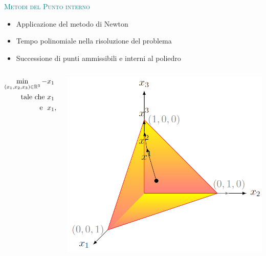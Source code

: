 
\begin{frame}{\textcolor{teal}{\textsc{\LARGE Metodi del Punto interno}}}
	\begin{itemize}
		\pause
		\item Applicazione del metodo di Newton
		\pause
		\item Tempo polinomiale nella risoluzione del problema
		\pause
		\item Successione di punti ammissibili e interni al poliedro
	\end{itemize}
\pause
\begin{columns}
	\begin{column}{0.4\textwidth}
		\begin{align*}
		\min\limits_{(x_{1},x_{2},x_{3})\in\mathbb{R}^{3}} -&x_{1}+ x_{2}-4x_{3}\\
		\text{tale che    }&x_{1}+x_{2}+x_{3}=1,\\
		\text{\; e   \;} &x_{1}, x_{2}, x_{3} \geq 0
		\end{align*}
	\end{column}
	\pause
	\begin{column}{0.4\textwidth}
		\includegraphics[width=\columnwidth]{Feas2.jpg}
	\end{column}
\end{columns}
\end{frame}



